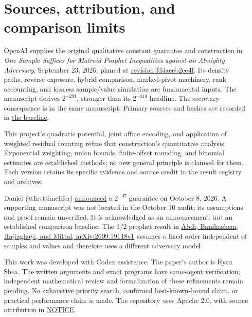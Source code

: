 \documentclass[11pt]{article}
\begin{document}
\section{Sources, attribution, and comparison limits}\label{sources-attribution-and-comparison-limits}

OpenAI supplies the original qualitative constant guarantee and construction in \emph{One Sample Suffices for Matroid Prophet Inequalities against an Almighty Adversary}, September 23, 2026, pinned at \href{https://github.com/openai/math/tree/fd4aeeb2ee4fc729c18d98444fed42fd0529eeeb}{revision fd4aeeb2ee4f}. Its density paths, reverse exposure, hybrid comparison, marked-pivot machinery, rank accounting, and lossless sample/value simulation are fundamental inputs. The manuscript derives \(2^{-293}\), stronger than its \(2^{-310}\) headline. The secretary consequence is in the same manuscript. Primary sources and hashes are recorded in \href{https://github.com/shea256/matroid-prophet-inequality/blob/master/BASELINE.md}{the baseline}.

This project's quadratic potential, joint affine encoding, and application of weighted residual counting refine that construction's quantitative analysis. Exponential weighting, union bounds, finite-offset rounding, and binomial estimates are established methods; no new general principle is claimed for them. Each version retains its specific evidence and source credit in the result registry and archives.

Daniel (@firsttimelifer) \href{https://x.com/firsttimelifer/status/2108282829809541468}{announced} a \(2^{-47}\) guarantee on October 8, 2026. A supporting manuscript was not located in the October 10 audit; its assumptions and proof remain unverified. It is acknowledged as an announcement, not an established comparison baseline. The \(1/2\) prophet result in \href{https://arxiv.org/abs/2609.19118v1}{Abdi, Banihashem, Hajiaghayi, and Mittal, arXiv:2609.19118v1} assumes a fixed order independent of samples and values and therefore uses a different adversary model.

This work was developed with Codex assistance. The paper's author is Ryan Shea. The written arguments and exact programs have same-agent verification; independent mathematical review and formalization of these refinements remain pending. No exhaustive priority search, confirmed best-known-bound claim, or practical performance claim is made. The repository uses Apache 2.0, with source attribution in \href{https://github.com/shea256/matroid-prophet-inequality/blob/master/NOTICE}{NOTICE}.
\end{document}
